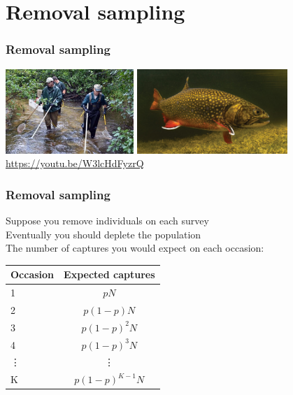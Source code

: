 \documentclass[color=usenames,dvipsnames]{beamer}\usepackage[]{graphicx}\usepackage[]{color}
\begin{document}
\section{Removal sampling}


\begin{frame}
  \frametitle{Removal sampling}
  \centering
  \includegraphics[height=3.2cm]{figs/electrofishing} \hfill
  \includegraphics[height=3.2cm]{figs/brook_trout}
  \vfill
  \color{blue}
  \url{https://youtu.be/W3lcHdFyzrQ} \\
\end{frame}


\begin{frame}
  \frametitle{Removal sampling}
  \large
  { Suppose you remove individuals on each survey \\}
  \vfill
  \pause
  { Eventually you should deplete the population \\}
  \vfill
  \pause
  { The number of captures you would expect on each occasion:}
  \begin{center}
    \begin{tabular}{lc}
      \hline
      Occasion & Expected captures \\
      \hline
      1 & $pN$ \\
      2 & $p(1-p)N$ \\
      3 & $p(1-p)^2N$ \\
      4 & $p(1-p)^3N$ \\
      \vdots & \vdots \\
      K & $p(1-p)^{K-1}N$ \\
      \hline
    \end{tabular}
  \end{center}
\end{frame}
\end{document}
